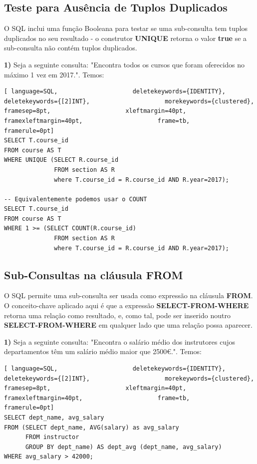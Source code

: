 \documentclass[titlepage]{book}
\theoremstyle{definition}
\begin{document}
\subsection{Teste para Ausência de Tuplos Duplicados}
O SQL inclui uma função Booleana para testar se uma sub-consulta tem tuplos duplicados no seu resultado - o construtor \textbf{UNIQUE} retorna o valor \textbf{true} se a sub-consulta não contém tuplos duplicados.

\textbf{1)} Seja a seguinte consulta: "Encontra todos os cursos que foram oferecidos no máximo 1 vez em 2017.". Temos:
\begin{lstlisting}[ language=SQL,                     deletekeywords={IDENTITY},                     deletekeywords={[2]INT},                     morekeywords={clustered},                     framesep=8pt,                     xleftmargin=40pt,                     framexleftmargin=40pt,                     frame=tb,                     framerule=0pt]
SELECT T.course_id
FROM course AS T
WHERE UNIQUE (SELECT R.course_id
              FROM section AS R
              where T.course_id = R.course_id AND R.year=2017);
              
-- Equivalentemente podemos usar o COUNT
SELECT T.course_id
FROM course AS T
WHERE 1 >= (SELECT COUNT(R.course_id)
              FROM section AS R
              where T.course_id = R.course_id AND R.year=2017);
\end{lstlisting}

\subsection{Sub-Consultas na cláusula FROM}
O SQL permite uma sub-consulta ser usada como expressão na cláusula \textbf{FROM}. O conceito-chave aplicado aqui é que a expressão \textbf{SELECT-FROM-WHERE} retorna uma relação como resultado, e, como tal, pode ser inserido noutro \textbf{SELECT-FROM-WHERE} em qualquer lado que uma relação possa aparecer.

\textbf{1)} Seja a seguinte consulta: "Encontra o salário médio dos instrutores cujos departamentos têm um salário médio maior que 2500€.". Temos:
\pagebreak
\begin{lstlisting}[ language=SQL,                     deletekeywords={IDENTITY},                     deletekeywords={[2]INT},                     morekeywords={clustered},                     framesep=8pt,                     xleftmargin=40pt,                     framexleftmargin=40pt,                     frame=tb,                     framerule=0pt]
SELECT dept_name, avg_salary
FROM (SELECT dept_name, AVG(salary) as avg_salary
      FROM instructor
      GROUP BY dept_name) AS dept_avg (dept_name, avg_salary)
WHERE avg_salary > 42000;
\end{lstlisting}
\end{document}

